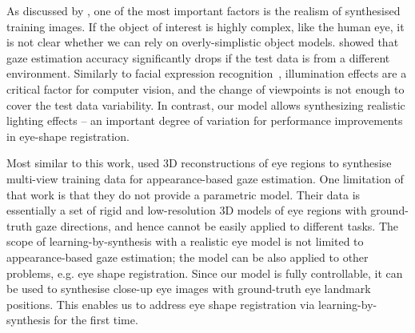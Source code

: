As discussed by \citet{kaneva2011evaluation}, one of the most important factors is the realism of synthesised training images.
If the object of interest is highly complex, like the human eye, it is not clear whether we can rely on overly-simplistic object models.
\citet{zhang15_cvpr} showed that gaze estimation accuracy significantly drops if the test data is from a different environment.
Similarly to facial expression recognition~\cite{stratou2011effect}, illumination effects are a critical factor for computer vision, and the change of viewpoints is not enough to cover the test data variability.
In contrast, our model allows synthesizing realistic lighting effects -- an important degree of variation for performance improvements in eye-shape registration.

Most similar to this work, \citet{sugano2014learning} used 3D reconstructions of eye regions to synthesise multi-view training data for appearance-based gaze estimation.
One limitation of that work is that they do not provide a parametric model.
Their data is essentially a set of rigid and low-resolution 3D models of eye regions with ground-truth gaze directions, and hence cannot be easily applied to different tasks.
The scope of learning-by-synthesis with a realistic eye model is not limited to appearance-based gaze estimation; the model can be also applied to other problems, e.g. eye shape registration.
Since our model is fully controllable, it can be used to synthesise close-up eye images with ground-truth eye landmark positions.
This enables us to address eye shape registration via learning-by-synthesis for the first time.



